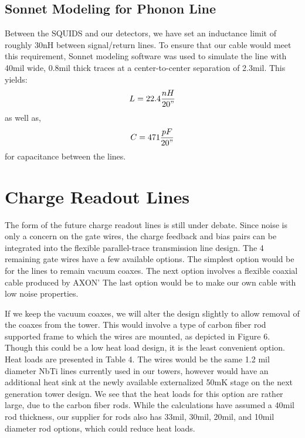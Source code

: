 \documentclass{article}
\begin{document}

\newpage
\subsection{Sonnet Modeling for Phonon Line}
Between the SQUIDS and our detectors, we have set an inductance limit of roughly 30nH between signal/return lines. To ensure that our cable would meet this requirement, Sonnet modeling software was used to simulate the line with 40mil wide, 0.8mil thick traces at a center-to-center separation of 2.3mil. This yields:
$$
L = 22.4\frac{nH}{20"}
$$
as well as,
$$
C = 471\frac{pF}{20"}
$$
for capacitance between the lines.

\section{Charge Readout Lines}

The form of the future charge readout lines is still under debate. Since noise is only a concern on the gate wires, the charge feedback and bias pairs can be integrated into the flexible parallel-trace transmission line design. The 4 remaining gate wires have a few available options. The simplest option would be for the lines to remain vacuum coaxes. The next option involves a flexible coaxial cable produced by AXON' The last option would be to make our own cable with low noise properties.

If we keep the vacuum coaxes, we will alter the design slightly to allow removal of the coaxes from the tower. This would involve a type of carbon fiber rod supported frame to which the wires are mounted, as depicted in Figure 6. Though this could be a low heat load design, it is the least convenient option. Heat loads are presented in Table 4. The wires would be the same 1.2 mil diameter NbTi lines currently used in our towers, however would have an additional heat sink at the newly available externalized 50mK stage on the next generation tower design. We see that the heat loads for this option are rather large, due to the carbon fiber rods. While the calculations have assumed a 40mil rod thickness, our supplier for rods also has 33mil, 30mil, 20mil, and 10mil diameter rod options, which could reduce heat loads.
\end{document}
